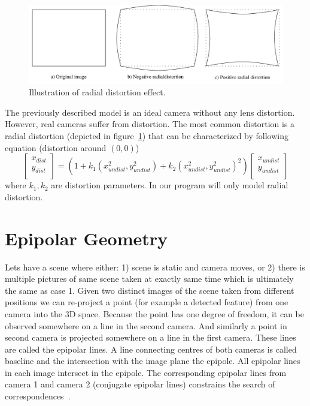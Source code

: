 \begin{figure}[!htbp]
	\begin{center}
		\includegraphics[keepaspectratio,width=\textwidth]{fig/distortion.pdf}
	\end{center}
	\caption{Illustration of radial distortion effect.}
	\label{fig:dist}
\end{figure}

The previously described model is an ideal camera without any lens distortion. However, real cameras suffer from distortion. The most common distortion is a radial distortion (depicted in figure~\ref{fig:dist}) that can be characterized by following equation (distortion around $(0,0)$)
\begin{equation}
	\begin{bmatrix}
		x_{dist} \\
		y_{dist} \\
	\end{bmatrix}
	= (1 + k_1(x^2_{undist}, y^2_{undist}) + k_2(x^2_{undist}, y^2_{undist})^2)
	\begin{bmatrix}
		x_{undist} \\
		y_{undist} \\
	\end{bmatrix}
	\label{distortion}
\end{equation}
where $k_1,k_2$ are distortion parameters. In our program will only model radial distortion.

\section{Epipolar Geometry}
Lets have a scene where either: 1) scene is static and camera moves, or 2) there is multiple pictures of same scene taken at exactly same time which is ultimately the same as case 1. Given two distinct images of the scene taken from different positions we can re-project a point (for example a detected feature) from one camera into the 3D space. Because the point has one degree of freedom, it can be observed somewhere on a line in the second camera. And similarly a point in second camera is projected somewhere on a line in the first camera. These lines are called the epipolar lines. A line connecting centres of both cameras is called baseline and the intersection with the image plane the epipole. All epipolar lines in each image intersect in the epipole. The corresponding epipolar lines from camera 1 and camera 2 (conjugate epipolar lines) constrains the search of correspondences~\cite{www:multi-view-geometry-presentation, www:extrinsic-camera, www:visual-3D-modeling, book:multiple_view_geometry}.

